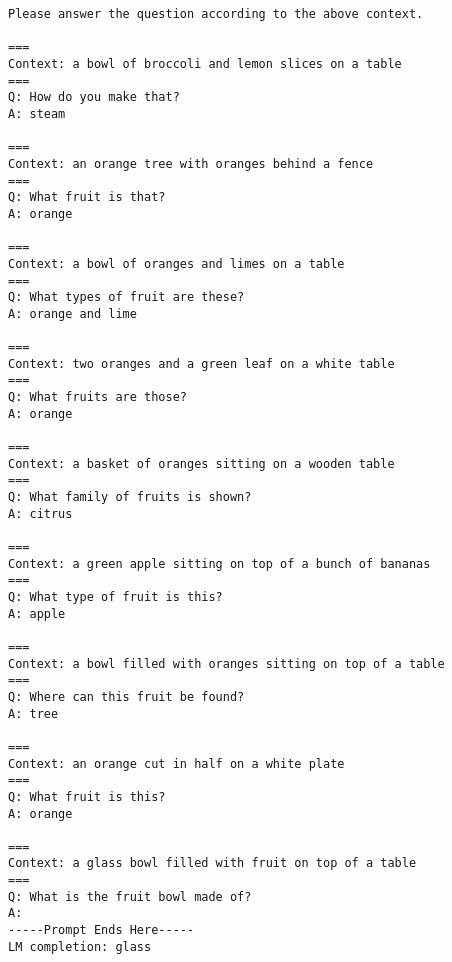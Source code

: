 \documentclass[10pt,twocolumn,letterpaper]{article}
\begin{document}
\begin{tiny}
\begin{lstlisting}
Please answer the question according to the above context.

===
Context: a bowl of broccoli and lemon slices on a table 
===
Q: How do you make that?
A: steam

===
Context: an orange tree with oranges behind a fence 
===
Q: What fruit is that?
A: orange

===
Context: a bowl of oranges and limes on a table 
===
Q: What types of fruit are these?
A: orange and lime

===
Context: two oranges and a green leaf on a white table 
===
Q: What fruits are those?
A: orange

===
Context: a basket of oranges sitting on a wooden table 
===
Q: What family of fruits is shown?
A: citrus

===
Context: a green apple sitting on top of a bunch of bananas 
===
Q: What type of fruit is this?
A: apple

===
Context: a bowl filled with oranges sitting on top of a table 
===
Q: Where can this fruit be found?
A: tree

===
Context: an orange cut in half on a white plate 
===
Q: What fruit is this?
A: orange

===
Context: a glass bowl filled with fruit on top of a table 
===
Q: What is the fruit bowl made of?
A:
-----Prompt Ends Here-----
LM completion: glass
\end{lstlisting}
\end{tiny}
 
\end{document}
